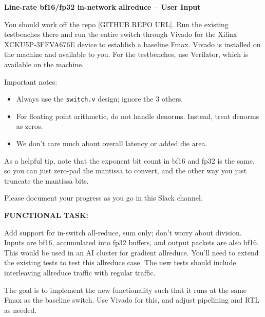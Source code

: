 \begin{tcolorbox}[
	colback=white,
	colframe=black,
	coltext=vrkblue,
	breakable,
	fontupper={\scriptsize\fontfamily{pcr}\selectfont},
	before upper={\RaggedRight}
	]
	\textbf{Line-rate bf16/fp32 in-network allreduce -- User Input}
	\par\smallskip
	
	You should work off the repo [GITHUB REPO URL]. Run the existing testbenches there and run the entire switch through Vivado for the Xilinx XCKU5P-3FFVA676E device to establish a baseline Fmax. Vivado is installed on the machine and available to you. For the testbenches, use Verilator, which is available on the machine.
	
	\par\smallskip
	Important notes:
	
	\begin{itemize}[leftmargin=*, topsep=2pt, itemsep=1pt]
		\item Always use the \texttt{switch.v} design; ignore the 3 others.
		\item For floating point arithmetic, do not handle denorms. Instead, treat denorms as zeros.
		\item We don't care much about overall latency or added die area.
	\end{itemize}
	
	\par\smallskip
	As a helpful tip, note that the exponent bit count in bf16 and fp32 is the same, so you can just zero-pad the mantissa to convert, and the other way you just truncate the mantissa bits.
	
	\par\smallskip
	Please document your progress as you go in this Slack channel.
	
	\par\smallskip
	\textbf{FUNCTIONAL TASK:}
	
	\par\smallskip
	Add support for in-switch all-reduce, sum only; don't worry about division. Inputs are bf16, accumulated into fp32 buffers, and output packets are also bf16. This would be used in an AI cluster for gradient allreduce. You'll need to extend the existing tests to test this allreduce case. The new tests should include interleaving allreduce traffic with regular traffic.
	
	\par\smallskip
	The goal is to implement the new functionality such that it runs at the same Fmax as the baseline switch. Use Vivado for this, and adjust pipelining and RTL as needed.
	

\end{tcolorbox}
